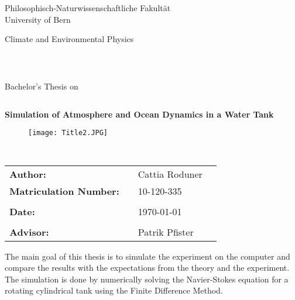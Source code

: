 \documentclass[12pt, a4paper]{article} %
\begin{document}
%

\thispagestyle{empty}
\begin{center}
\Large{Philosophisch-Naturwissenschaftliche Fakultät}\\
\Large{University of Bern}\\
\end{center}


\begin{center}
\Large{Climate and Environmental Physics}
\end{center}
\begin{verbatim}



\end{verbatim}
\begin{center}
\large{Bachelor's Thesis on}
\end{center}
\begin{verbatim}

\end{verbatim}
\begin{center}
\textbf{\Large{Simulation of Atmosphere and Ocean Dynamics in a Water Tank}}\\
\end{center}

\begin{figure}[h]
 \centering
 \texttt{[image: Title2.JPG]}
\end{figure}

\begin{verbatim}


\end{verbatim}

\begin{center}
\begin{tabular}{llll}

\textbf{Author:} & & Cattia Roduner& \\
\textbf{Matriculation Number:} & & 10-120-335& \\
& & &\\
\textbf{Date:} & & \today &\\
& & &\\
\textbf{Advisor:} & & Patrik Pfister &\\

\end{tabular}

\end{center}
\newpage
\thispagestyle{empty}
\mbox{}
\newpage
\abstract
	The main goal of this thesis is to simulate the experiment on the computer and compare the results with the expectations from the theory and the experiment. The simulation is done by numerically solving the Navier-Stokes equation for a rotating cylindrical tank using the Finite Difference Method.
\end{document}
